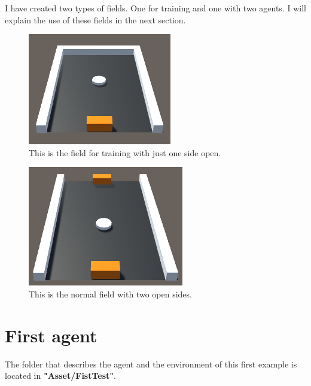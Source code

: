 \documentclass[12pt]{article}
\begin{document}
	\noindent
	I have created two types of fields. One for training and one with two agents. I will explain the use of these fields in the next section.

	\begin{figure}[hbt!]
		\centering
		\includegraphics[width= 0.70
		\textwidth]{images/TrainingField2}
		\caption{This is the field for training with just one side open.}
		\label{lbl:traningField}
	\end{figure} 
	
	\newpage
	
	\begin{figure}[hbt!]
		\centering
		\includegraphics[width= 0.70
		\textwidth]{images/AgentVsAgentField2}
		\caption{This is the normal field with two open sides.}
	\end{figure} 
	
	\newpage
	
	\section{First agent}
	The folder that describes the agent and the environment of this first example is located in \textbf{"Asset/FistTest"}.
	
\end{document}
